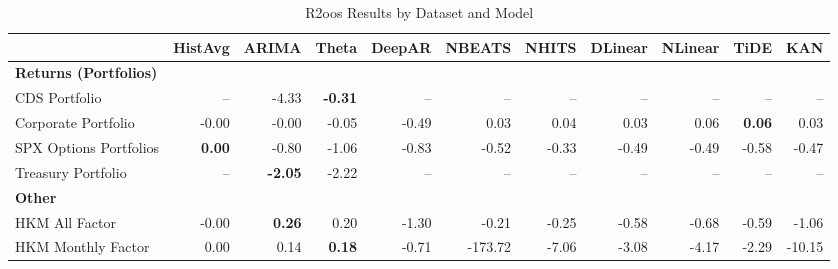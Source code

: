 
\begin{table}[htbp]
\centering
\caption{R2oos Results by Dataset and Model}
\label{tab:r2oos_results}
\scriptsize
\setlength{\tabcolsep}{1.5pt}
\renewcommand{\arraystretch}{0.9}
\begin{tabular}{@{}lrrrrrrrrrr@{}}
\toprule
 & HistAvg & ARIMA & Theta & DeepAR & NBEATS & NHITS & DLinear & NLinear & TiDE & KAN \\
\midrule
\multicolumn{11}{l}{\textbf{Returns (Portfolios)}} \\
CDS Portfolio & -- & -4.33 & \textbf{-0.31} & -- & -- & -- & -- & -- & -- & -- \\
Corporate Portfolio & -0.00 & -0.00 & -0.05 & -0.49 & 0.03 & 0.04 & 0.03 & 0.06 & \textbf{0.06} & 0.03 \\
SPX Options Portfolios & \textbf{0.00} & -0.80 & -1.06 & -0.83 & -0.52 & -0.33 & -0.49 & -0.49 & -0.58 & -0.47 \\
Treasury Portfolio & -- & \textbf{-2.05} & -2.22 & -- & -- & -- & -- & -- & -- & -- \\
\midrule
\multicolumn{11}{l}{\textbf{Other}} \\
HKM All Factor & -0.00 & \textbf{0.26} & 0.20 & -1.30 & -0.21 & -0.25 & -0.58 & -0.68 & -0.59 & -1.06 \\
HKM Monthly Factor & 0.00 & 0.14 & \textbf{0.18} & -0.71 & -173.72 & -7.06 & -3.08 & -4.17 & -2.29 & -10.15 \\
\bottomrule
\end{tabular}
\vspace{0.1cm}

\end{table}
